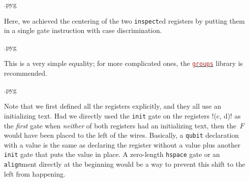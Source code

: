 \documentclass{scrartcl}
\makeatletter
\newenvironment{codeexample}{%
   \VerbatimEnvironment%
   \let\FVB@VerbatimOut\minted@FVB@VerbatimOut
   \let\FVE@VerbatimOut\minted@FVE@VerbatimOut
   \minted@configlang{tex}%
   \minted@fvset
   \begin{VerbatimOut}[codes={\catcode`\^^I=12},firstline,lastline]{\minted@jobname.pyg}%
}{
   \end{VerbatimOut}%
   \minted@langlinenoson%
   \savebox\codeexamplebox{ \minted@jobname.pyg}%
   \ifdim\wd\codeexamplebox>\dimexpr.5\linewidth-3mm\relax%
      \wd\codeexamplebox=.5\linewidth%
   \else%
      \wd\codeexamplebox=\dimexpr\wd\codeexamplebox+3mm\relax%
   \fi%
   \noindent\begin{minipage}{\wd\codeexamplebox}%
      \centering%
      \usebox\codeexamplebox%
   \end{minipage}%
   \begin{minipage}{\dimexpr\linewidth-\wd\codeexamplebox\relax}%
      \expandafter\minted@pygmentize\expandafter{\minted@lang}%
   \end{minipage}%
   \minted@langlinenosoff%
   \par%
}
\def\pkg#1{\textcolor{brown}{\texttt{#1}}}
\def\langlink#1{\hyperref[sec:foreign:#1]{\pkg{#1}}}
\def\ttlink{\link\texttt}
\makeatother
\begin{document}
            \begin{example}
               \begin{codeexample}
               \end{codeexample}
               Here, we achieved the centering of the two \ttlink{inspect}ed registers by putting them in a single gate instruction with case discrimination.
            \end{example}

            \begin{example}
               \begin{codeexample}
               \end{codeexample}
               This is a very simple equality; for more complicated ones, the \langlink{groups} library is recommended.
            \end{example}

            \begin{example}
               \begin{codeexample}
               \end{codeexample}
               Note that we first defined all the registers explicitly, and they all use an initializing text.
               Had we directly used the \ttlink{init} gate on the registers \yquant!(c, d)! as the \emph{first} gate when \emph{neither} of both registers had an initializing text, then the~$F$ would have been placed to the left of the wires.
               Basically, a \ttlink{qubit} declaration with a value is the same as declaring the register without a value plus another \ttlink{init} gate that puts the value in place.
               A zero\hyp length \ttlink{hspace} gate or an \ttlink{align}ment directly at the beginning would be a way to prevent this shift to the left from happening.
            \end{example}
\end{document}

